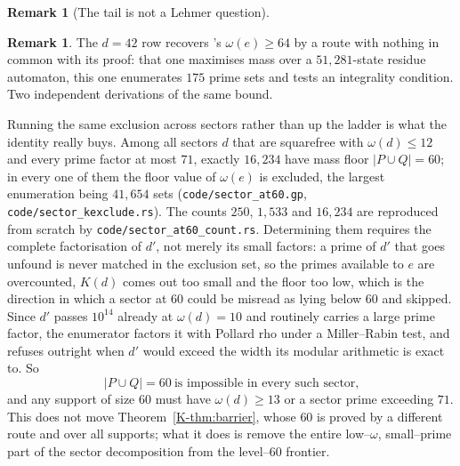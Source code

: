 \documentclass[11pt]{article}
\theoremstyle{definition}
\newtheorem{remark}[theorem]{Remark}
\begin{document}
\begin{remark}[The tail is not a Lehmer question]
\begin{remark}
The $d=42$ row recovers \cite{Bado2026b}'s $\omega(e)\ge64$ by a route with nothing in common with
its proof: that one maximises mass over a $51{,}281$-state residue automaton, this one enumerates
$175$ prime sets and tests an integrality condition. Two independent derivations of the same bound.

Running the same exclusion across sectors rather than up the ladder is what the identity really
buys. Among all sectors $d$ that are squarefree with $\omega(d)\le12$ and every prime factor at most
$71$, exactly $16{,}234$ have mass floor $|P\cup Q|=60$; in every one of them the floor value of
$\omega(e)$ is excluded, the largest enumeration being $41{,}654$ sets
\textup{(\texttt{code/sector\_at60.gp}, \texttt{code/sector\_kexclude.rs})}. The counts $250$, $1{,}533$
and $16{,}234$ are reproduced from scratch by \texttt{code/sector\_at60\_count.rs}. Determining them
requires the complete factorisation of $d'$, not merely its small factors: a prime of $d'$ that goes
unfound is never matched in the exclusion set, so the primes available to $e$ are overcounted, $K(d)$
comes out too small and the floor too low, which is the direction in which a sector at $60$ could be
misread as lying below $60$ and skipped. Since $d'$ passes $10^{14}$ already at $\omega(d)=10$ and
routinely carries a large prime factor, the enumerator factors it with Pollard rho under a
Miller--Rabin test, and refuses outright when $d'$ would exceed the width its modular arithmetic is
exact to. So
\[ |P\cup Q|=60\ \text{is impossible in every such sector,} \]
and any support of size $60$ must have $\omega(d)\ge13$ or a sector prime exceeding $71$. This does
not move Theorem~\ref{K-thm:barrier}, whose $60$ is proved by a different route and over all supports;
what it does is remove the entire low--$\omega$, small--prime part of the sector decomposition from
the level--$60$ frontier.


\end{remark}
\end{remark}
\end{document}
